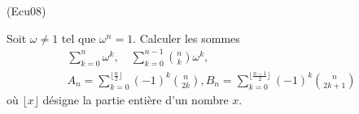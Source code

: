 \begin{tiny}(Ecu08)\end{tiny}
Soit $\omega \neq 1$ tel que $\omega ^{n}=1$. Calculer les sommes
\begin{multline*}
\sum_{k=0}^{n}\omega ^{k},\quad \sum_{k=0}^{n-1}\binom{n}{k}\omega ^{k},\\ 
A_{n} = \sum_{k=0}^{\lfloor\frac{n}{2}\rfloor}(-1)^{k}\binom{n}{2k}, 
B_{n} = \sum_{k=0}^{\lfloor\frac{n-1}{2}\rfloor}(-1)^{k}\binom{n}{2k+1}
\end{multline*}
où $\lfloor x\rfloor$ désigne la partie entière d'un nombre $x$.